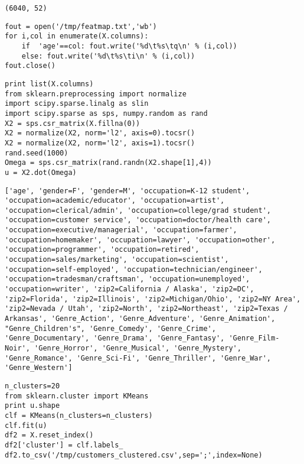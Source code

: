 \documentclass[12pt,fleqn]{article}\usepackage{../common}
\begin{document}
\begin{verbatim}
(6040, 52)
\end{verbatim}
\begin{verbatim}
fout = open('/tmp/featmap.txt','wb')
for i,col in enumerate(X.columns):
    if  'age'==col: fout.write('%d\t%s\tq\n' % (i,col))
    else: fout.write('%d\t%s\ti\n' % (i,col))    
fout.close()
\end{verbatim}

\begin{verbatim}
print list(X.columns)
from sklearn.preprocessing import normalize
import scipy.sparse.linalg as slin
import scipy.sparse as sps, numpy.random as rand
X2 = sps.csr_matrix(X.fillna(0))
X2 = normalize(X2, norm='l2', axis=0).tocsr()
X2 = normalize(X2, norm='l2', axis=1).tocsr()    
rand.seed(1000)
Omega = sps.csr_matrix(rand.randn(X2.shape[1],4))
u = X2.dot(Omega)
\end{verbatim}

\begin{verbatim}
['age', 'gender=F', 'gender=M', 'occupation=K-12 student', 'occupation=academic/educator', 'occupation=artist', 'occupation=clerical/admin', 'occupation=college/grad student', 'occupation=customer service', 'occupation=doctor/health care', 'occupation=executive/managerial', 'occupation=farmer', 'occupation=homemaker', 'occupation=lawyer', 'occupation=other', 'occupation=programmer', 'occupation=retired', 'occupation=sales/marketing', 'occupation=scientist', 'occupation=self-employed', 'occupation=technician/engineer', 'occupation=tradesman/craftsman', 'occupation=unemployed', 'occupation=writer', 'zip2=California / Alaska', 'zip2=DC', 'zip2=Florida', 'zip2=Illinois', 'zip2=Michigan/Ohio', 'zip2=NY Area', 'zip2=Nevada / Utah', 'zip2=North', 'zip2=Northeast', 'zip2=Texas / Arkansas', 'Genre_Action', 'Genre_Adventure', 'Genre_Animation', "Genre_Children's", 'Genre_Comedy', 'Genre_Crime', 'Genre_Documentary', 'Genre_Drama', 'Genre_Fantasy', 'Genre_Film-Noir', 'Genre_Horror', 'Genre_Musical', 'Genre_Mystery', 'Genre_Romance', 'Genre_Sci-Fi', 'Genre_Thriller', 'Genre_War', 'Genre_Western']
\end{verbatim}

\begin{verbatim}
n_clusters=20
from sklearn.cluster import KMeans
print u.shape
clf = KMeans(n_clusters=n_clusters)
clf.fit(u)    
df2 = X.reset_index()
df2['cluster'] = clf.labels_
df2.to_csv('/tmp/customers_clustered.csv',sep=';',index=None)
\end{verbatim}
\end{document}
